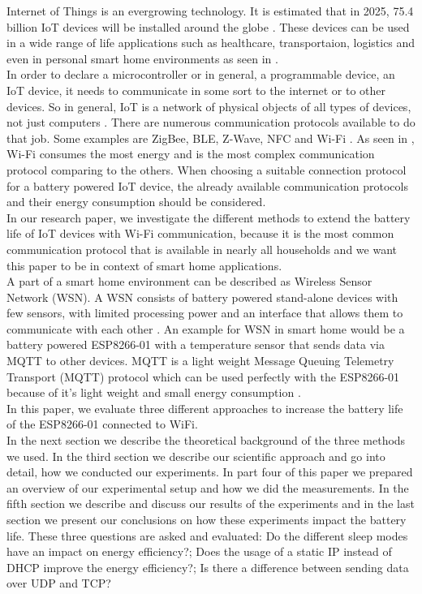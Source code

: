 Internet of Things is an evergrowing technology. It is estimated that in 2025, 75.4 billion IoT devices will be installed around the globe \cite{lucero2016iot}. These devices can be used in a wide range of life applications such as healthcare, transportaion, logistics and even in personal smart home environments as seen in \cite{6803174}.\\  
In order to declare a microcontroller or in general, a programmable device, an IoT device, it needs to communicate in some sort to the internet or to other devices. So in general, IoT is a network of physical objects of all types of devices, not just computers \cite{patel2016internet}. There are numerous communication protocols available to do that job. Some examples are ZigBee, BLE, Z-Wave, NFC and Wi-Fi \cite{8079928}. As seen in \cite{8088226}, Wi-Fi consumes the most energy and is the most complex communication protocol comparing to the others.  
When choosing a suitable connection protocol for a battery powered IoT device, the already available communication protocols and their energy consumption should be considered.\\
In our research paper, we investigate the different methods to extend the battery life of IoT devices with Wi-Fi communication, because it is the most common communication protocol that is available in nearly all households and we want this paper to be in context of smart home applications.\\
A part of a smart home environment can be described as Wireless Sensor Network (WSN). A WSN consists of battery powered stand-alone devices with few sensors, with limited processing power and an interface that allows them to communicate with each other \cite{wsn}. 
An example for WSN in smart home would be a battery powered ESP8266-01 with a temperature sensor that sends data via MQTT to other devices.
MQTT is a light weight Message Queuing Telemetry Transport (MQTT) protocol which can be used perfectly with the ESP8266-01 because of it's light weight and small energy consumption \cite{kodali_mqtt_2016}.\\
In this paper, we evaluate three different approaches to increase the battery life of the ESP8266-01 connected to WiFi.\\
In the next section we describe the theoretical background of the three methods we used. 
In the third section we describe our scientific approach and go into detail, how we conducted our experiments.
In part four of this paper we prepared an overview of our experimental setup and how we did the measurements.
In the fifth section we describe and discuss our results of the experiments and in the last section we present our conclusions on how these experiments impact the battery life.
These three questions are asked and evaluated: Do the different sleep modes have an impact on energy efficiency?; Does the usage of a static IP instead of DHCP improve the energy efficiency?; Is there a difference between sending data over UDP and TCP?
